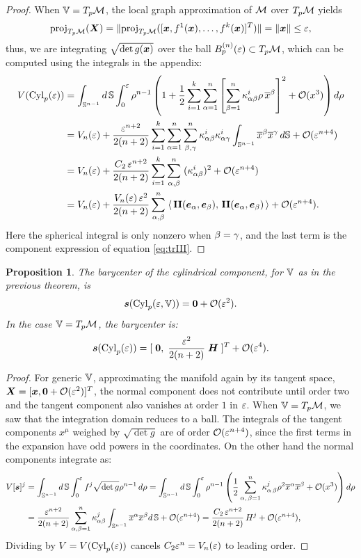 \documentclass[letterpaper, reqno, 11pt]{amsart}
\newtheorem{proposition}[theorem]{Proposition}
\theoremstyle{definition}
\theoremstyle{remark}
\numberwithin{equation}{section}
\begin{document}
\begin{proof}
When $\VV=T_p\cM$, the local graph approximation of $\cM$ over $T_p\cM$ yields
$$\projj{\bs{X}}{T_p\cM} = \|\projj{[\bx,f^1(\bx),\dots,f^k(\bx)]^T}{T_p\cM}\|=\|\bx\| \leq\vep,$$
thus, we are integrating $\sqrt{\det g(\bx)}$ over the ball $B^{(n)}_p(\vep)\subset T_p\cM$, which can be computed using the integrals in the appendix:
\begin{align*}
	V(\Cyll(\vep)) & = \int_{\SS^{n-1}}d\,\SS\int^\vep_0 \rho^{n-1}\left( 1+\frac{1}{2}\sum^k_{i=1}\sum^n_{\al=1}\left[\sum^n_{\bet=1}\ka^i_{\al\bet}\rho\,\cx^\bet \right]^2 +\cO(x^3) \right)d\rho \\
	& = V_n(\vep) + \frac{\vep^{n+2}}{2(n+2)}\sum^k_{i=1}\sum^n_{\al=1}\sum^n_{\bet,\ga}\ka^i_{\al\bet}\ka^i_{\al\ga}\int_{\SS^{n-1}}\cx^\bet\cx^\ga \,d\SS +\cO(\vep^{n+4}) \\
	& = V_n(\vep) + \frac{C_2\,\vep^{n+2}}{2(n+2)}\sum^k_{i=1}\sum^n_{\al,\bet}\;(\ka^i_{\al\bet})^2 +\cO(\vep^{n+4}) \\
	& = V_n(\vep) + \frac{V_n(\vep)\,\vep^{2}}{2(n+2)}\sum^n_{\al,\bet}\;\metric{\II(\bE_\al,\bE_\bet)}{\II(\bE_\al,\bE_\bet)}+\cO(\vep^{n+4}).
\end{align*}
Here the spherical integral is only nonzero when $\bet=\ga$, and the last term is the component expression of equation \ref{eq:trIII}.
\end{proof}

\begin{proposition}
	The barycenter of the cylindrical component, for $\VV$ as in the previous theorem, is 
\begin{equation}
	\bb(\Cyll(\vep,\VV)) = \bze +\cO(\vep^2).
\end{equation}
	In the case $\VV=T_p\cM$, the barycenter is:
\begin{equation}
	\bb(\Cyll(\vep)) = [ \;\bze,\; \frac{\vep^2}{2(n+2)}\;\bH\;]^T +\cO(\vep^4).
\end{equation}
\end{proposition}
\begin{proof}
For generic $\VV$, approximating the manifold again by its tangent space, $\bs{X}=[\bx,\bze +\cO(\vep^2)]^T$, the normal component does not contribute until order two and the tangent component also vanishes at order $1$ in $\vep$. When $\VV=T_p\cM$, we saw that the integration domain reduces to a ball. The integrals of the tangent components $x^\mu$ weighed by $\sqrt{\det g}$ are of order $\cO(\vep^{n+4})$, since the first terms in the expansion have odd powers in the coordinates. On the other hand the normal components integrate as:
\begin{align*}
	V[\bb]^j & = \int_{\SS^{n-1}}d\,\SS\int^\vep_0 f^j\sqrt{\det g}\rho^{n-1}\, d\rho =  \int_{\SS^{n-1}}d\,\SS\int^\vep_0\rho^{n-1}\left(\frac{1}{2}\sum_{\al,\,\bet=1}^n\ka^j_{\al\,\bet}\rho^2\cx^\al\cx^\bet + \cO(x^3)\right) d\rho \\
	& = \frac{\vep^{n+2}}{2(n+2)}\sum_{\al,\bet=1}^n\ka^j_{\al\bet}\int_{\SS^{n-1}}\cx^\al\cx^\bet d\,\SS +\cO(\vep^{n+4}) = \frac{C_2\,\vep^{n+2}}{2(n+2)}\, H^j + \cO(\vep^{n+4}),
\end{align*}
Dividing by $V=V(\Cyll(\vep))$ cancels $C_2\vep^n=V_n(\vep)$ to leading order.
\end{proof}
\end{document}

